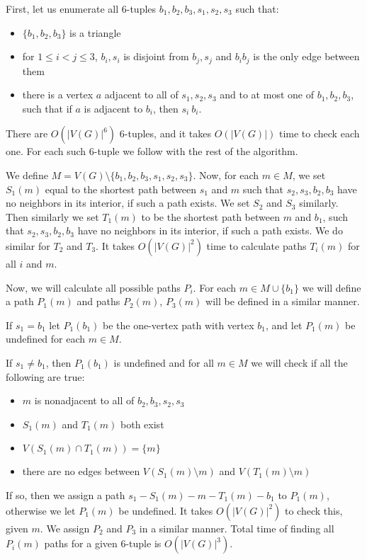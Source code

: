 \documentclass{report}
\begin{document}
First, let us enumerate all 6-tuples $b_1, b_2, b_3, s_1, s_2, s_3$ such that:
\begin{itemize}
	\item $\{b_1, b_2, b_3\}$ is a triangle
	\item for $1 \leq i < j \leq 3$, ${b_i, s_i}$ is disjoint from ${b_j, s_j}$ and $b_ib_j$ is the only edge between them
	\item there is a vertex $a$ adjacent to all of $s_1, s_2, s_3$ and to at most one of $b_1, b_2, b_3$, such that if $a$ is adjacent to $b_i$, then $s_i \ b_i$.
\end{itemize}

There are $O(|V(G)|^6)$ 6-tuples, and it takes $O(|V(G)|)$ time to check each one. For each such 6-tuple we follow with the rest of the algorithm.

We define $M = V(G) \setminus \{b_1, b_2, b_3, s_1, s_2, s_3\}$. Now, for each $m \in M$, we set $S_1(m)$ equal to the shortest path between $s_1$ and $m$ such that $s_2, s_3, b_2, b_3$ have no neighbors in its interior, if such a path exists. We set $S_2$ and $S_3$ similarly. Then similarly we set $T_1(m)$ to be the shortest path between $m$ and $b_1$, such that $s_2, s_3, b_2, b_3$ have no neighbors in its interior, if such a path exists. We do similar for $T_2$ and $T_3$. It takes $O(|V(G)|^2)$ time to calculate paths $T_i(m)$ for all $i$ and $m$.

Now, we will calculate all possible paths $P_i$. For each $m \in M \cup \{b_1\}$ we will define a path $P_1(m)$ and paths $P_2(m)$, $P_3(m)$ will be defined in a similar manner.

If $s_1 = b_1$ let $P_1(b_1)$ be the one-vertex path with vertex $b_1$, and let $P_1(m)$ be undefined for each $m \in M$.

If $s_1 \neq b_1$, then $P_1(b_1)$ is undefined and for all $m \in M$ we will check if all the following are true:
\begin{itemize}
	\item $m$ is nonadjacent to all of $b_2, b_3, s_2, s_3$
	\item $S_1(m)$ and $T_1(m)$ both exist
	\item $V(S_1(m) \cap T_1(m)) = \{m\}$
	\item there are no edges between $V(S_1(m) \setminus m)$ and $V(T_1(m) \setminus m)$
\end{itemize}
If so, then we assign a path $s_1-S_1(m)-m-T_1(m)-b_1$ to $P_1(m)$, otherwise we let $P_1(m)$ be undefined. It takes $O(|V(G)|^2)$ to check this, given $m$. We assign $P_2$ and $P_3$ in a similar manner. Total time of finding all $P_i(m)$ paths for a given 6-tuple is $O(|V(G)|^3)$.
\end{document}
